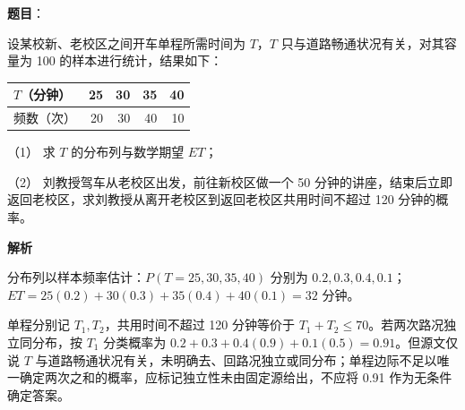 \begin{answer}

\textbf{题目}：

设某校新、老校区之间开车单程所需时间为 $T$，$T$ 只与道路畅通状况有关，对其容量为 100 的样本进行统计，结果如下：

\begin{center}
\begin{tabular}{lrrrr}
\toprule
$T$（分钟） & 25 & 30 & 35 & 40 \\
\midrule
频数（次） & 20 & 30 & 40 & 10 \\
\bottomrule
\end{tabular}
\end{center}

（1） 求 $T$ 的分布列与数学期望 $ET$；

（2） 刘教授驾车从老校区出发，前往新校区做一个 50 分钟的讲座，结束后立即返回老校区，求刘教授从离开老校区到返回老校区共用时间不超过 120 分钟的概率。

\textbf{解析}


分布列以样本频率估计：$P(T=25,30,35,40)$ 分别为 $0.2,0.3,0.4,0.1$；$ET=25(0.2)+30(0.3)+35(0.4)+40(0.1)=32$ 分钟。


单程分别记 $T_1,T_2$，共用时间不超过 120 分钟等价于 $T_1+T_2\le70$。若两次路况独立同分布，按 $T_1$ 分类概率为 $0.2+0.3+0.4(0.9)+0.1(0.5)=0.91$。但源文仅说 $T$ 与道路畅通状况有关，未明确去、回路况独立或同分布；单程边际不足以唯一确定两次之和的概率，应标记独立性未由固定源给出，不应将 0.91 作为无条件确定答案。



\end{answer}
